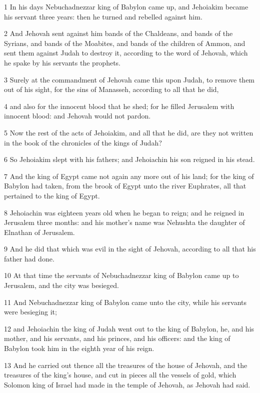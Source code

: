 \par 1 In his days Nebuchadnezzar king of Babylon came up, and Jehoiakim became his servant three years: then he turned and rebelled against him.
\par 2 And Jehovah sent against him bands of the Chaldeans, and bands of the Syrians, and bands of the Moabites, and bands of the children of Ammon, and sent them against Judah to destroy it, according to the word of Jehovah, which he spake by his servants the prophets.
\par 3 Surely at the commandment of Jehovah came this upon Judah, to remove them out of his sight, for the sins of Manasseh, according to all that he did,
\par 4 and also for the innocent blood that he shed; for he filled Jerusalem with innocent blood: and Jehovah would not pardon.
\par 5 Now the rest of the acts of Jehoiakim, and all that he did, are they not written in the book of the chronicles of the kings of Judah?
\par 6 So Jehoiakim slept with his fathers; and Jehoiachin his son reigned in his stead.
\par 7 And the king of Egypt came not again any more out of his land; for the king of Babylon had taken, from the brook of Egypt unto the river Euphrates, all that pertained to the king of Egypt.
\par 8 Jehoiachin was eighteen years old when he began to reign; and he reigned in Jerusalem three months: and his mother's name was Nehushta the daughter of Elnathan of Jerusalem.
\par 9 And he did that which was evil in the sight of Jehovah, according to all that his father had done.
\par 10 At that time the servants of Nebuchadnezzar king of Babylon came up to Jerusalem, and the city was besieged.
\par 11 And Nebuchadnezzar king of Babylon came unto the city, while his servants were besieging it;
\par 12 and Jehoiachin the king of Judah went out to the king of Babylon, he, and his mother, and his servants, and his princes, and his officers: and the king of Babylon took him in the eighth year of his reign.
\par 13 And he carried out thence all the treasures of the house of Jehovah, and the treasures of the king's house, and cut in pieces all the vessels of gold, which Solomon king of Israel had made in the temple of Jehovah, as Jehovah had said.
